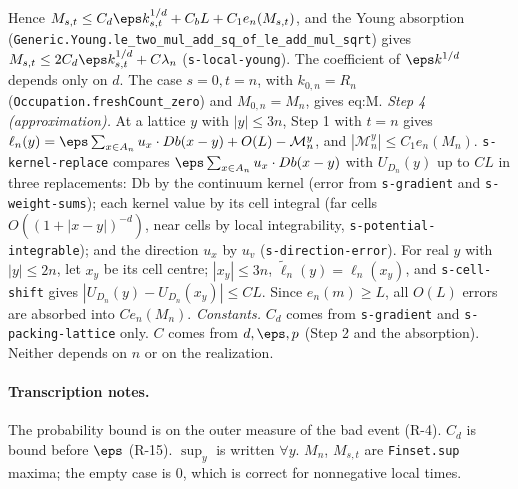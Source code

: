Hence $M_{s,t}\le C_d\eps k_{s,t}^{1/d}+C_bL+C_1e_n(M_{s,t})$, and the Young absorption
(\texttt{Generic.Young.le\_two\_mul\_add\_sq\_of\_le\_add\_mul\_sqrt}) gives
$M_{s,t}\le 2C_d\eps k_{s,t}^{1/d}+C\lambda_n$ (\texttt{s-local-young}). The coefficient of
$\eps k^{1/d}$ depends only on $d$. The case $s=0,t=n$, with $k_{0,n}=R_n$
(\texttt{Occupation.freshCount\_zero}) and $M_{0,n}=M_n$, gives eq:M.
\emph{Step 4 (approximation).} At a lattice $y$ with $|y|\le3n$, Step 1 with $t=n$ gives
$\ell_n(y)=\eps\sum_{x\in A_n}u_x\cdot Db(x-y)+O(L)-\mathcal M^y_n$, and $|\mathcal M^y_n|\le C_1e_n(M_n)$.
\texttt{s-kernel-replace} compares $\eps\sum_{x\in A_n}u_x\cdot Db(x-y)$ with $U_{D_n}(y)$ up to $CL$
in three replacements: Db by the continuum kernel (error from \texttt{s-gradient} and
\texttt{s-weight-sums}); each kernel value by its cell integral (far cells $O((1+|x-y|)^{-d})$,
near cells by local integrability, \texttt{s-potential-integrable}); and the direction $u_x$ by
$u_v$ (\texttt{s-direction-error}). For real $y$ with $|y|\le2n$, let $x_y$ be its cell centre;
$|x_y|\le3n$, $\widetilde\ell_n(y)=\ell_n(x_y)$, and \texttt{s-cell-shift} gives
$|U_{D_n}(y)-U_{D_n}(x_y)|\le CL$. Since $e_n(m)\ge L$, all $O(L)$ errors are absorbed into
$C e_n(M_n)$.
\emph{Constants.} $C_d$ comes from \texttt{s-gradient} and \texttt{s-packing-lattice} only. $C$
comes from $d,\eps,p$ (Step 2 and the absorption). Neither depends on $n$ or on the realization.
\paragraph{Transcription notes.} The probability bound is on the outer measure of the bad event
(R-4). $C_d$ is bound before $\eps$ (R-15). $\sup_y$ is written $\forall y$. $M_n$, $M_{s,t}$ are
\texttt{Finset.sup} maxima; the empty case is $0$, which is correct for nonnegative local times.
